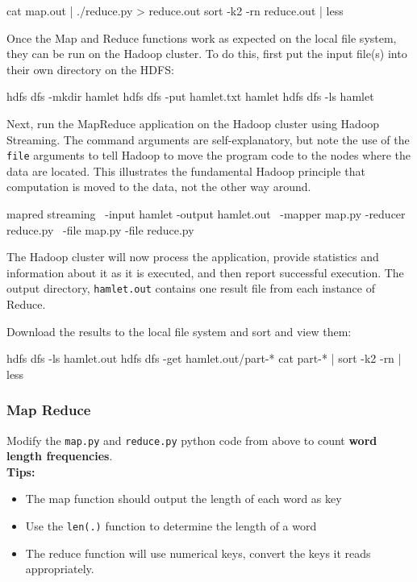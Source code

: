 \begin{bashcode}
cat map.out | ./reduce.py > reduce.out
sort -k2 -rn reduce.out | less
\end{bashcode}

Once the Map and Reduce functions work as expected on the local file system, they can be run on the Hadoop cluster. To do this, first put the input file(s) into their own directory on the HDFS:

\begin{bashcode}
hdfs dfs -mkdir hamlet
hdfs dfs -put hamlet.txt hamlet
hdfs dfs -ls hamlet
\end{bashcode}

Next, run the MapReduce application on the Hadoop cluster using Hadoop Streaming. The command arguments are self-explanatory, but note the use of the \texttt{file} arguments to tell Hadoop to move the program code to the nodes where the data are located. This illustrates the fundamental Hadoop principle that computation is moved to the data, not the other way around.

\begin{bashcode}
mapred streaming \
  -input hamlet -output hamlet.out \
  -mapper map.py -reducer reduce.py \
  -file map.py -file reduce.py
\end{bashcode}

The Hadoop cluster will now process the application, provide statistics and information about it as it is executed, and then report successful execution. The output directory, \texttt{hamlet.out} contains one result file from each instance of Reduce. 

Download the results to the local file system and sort and view them:

\begin{bashcode}
hdfs dfs -ls hamlet.out
hdfs dfs -get hamlet.out/part-*
cat part-* | sort -k2 -rn | less
\end{bashcode}

\begin{exercisebox}

\subsubsection*{Map Reduce}

Modify the \texttt{map.py} and \texttt{reduce.py} python code from above to count \textbf{word length frequencies}. \\

\vspace{\baselineskip}
\textbf{Tips:}
\begin{itemize}
   \item The map function should output the length of each word as key
   \item Use the \texttt{len(.)} function to determine the length of a word
   
   \item The reduce function will use numerical keys, convert the keys it reads appropriately.
\end{itemize}
\end{exercisebox}

